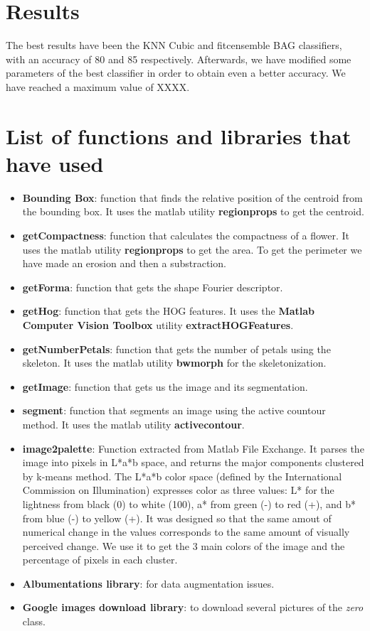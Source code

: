 \documentclass[11]{article}
\begin{document}
\section{Results}
\label{sec:results}

The best results have been the KNN Cubic and fitcensemble BAG classifiers, with an accuracy of 80 and 85 respectively. Afterwards, we have modified some parameters of the best classifier in order to obtain even a better accuracy. We have reached a maximum value of XXXX.

\section{List of functions and libraries that have used}
\begin{itemize}
\item \textbf{Bounding Box}: function that finds the relative position of the centroid from the bounding box. It uses the matlab utility \textbf{regionprops} to get the centroid.
\item \textbf{getCompactness}: function that calculates the compactness of a flower. It uses the matlab utility \textbf{regionprops} to get the area. To get the perimeter we have made an erosion and then a substraction. 
\item \textbf{getForma}: function that gets the shape Fourier descriptor. 
\item \textbf{getHog}: function that gets the HOG features. It uses the \textbf{Matlab Computer Vision Toolbox} utility \textbf{extractHOGFeatures}.
\item \textbf{getNumberPetals}: function that gets the number of petals using the skeleton. It uses the matlab utility \textbf{bwmorph} for the skeletonization. 
\item \textbf{getImage}: function that gets us the image and its segmentation.
\item \textbf{segment}: function that segments an image using the active countour method. It uses the matlab utility \textbf{activecontour}.
\item \textbf{image2palette}\cite{image2palette}: Function extracted from Matlab File Exchange. It parses the image into pixels in L*a*b space, and returns the major components clustered by k-means method. The L*a*b color space (defined by the International Commission on Illumination) expresses color as three values: L* for the lightness from black (0) to white (100), a* from green (-) to red (+), and b* from blue (-) to yellow (+). It was designed so that the same amout of numerical change in the values corresponds to the same amount of visually perceived change. We use it to get the 3 main colors of the image and the percentage of pixels in each cluster.

\item \textbf{Albumentations library}: for data augmentation issues.
\item \textbf{Google images download library}: to download several pictures of the \textit{zero} class.
\end{itemize}
\end{document}
